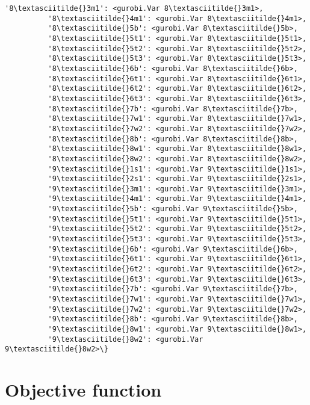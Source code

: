 \documentclass[11pt]{article}
\begin{document}
\begin{Verbatim}[commandchars=\\\{\}]
          '8\textasciitilde{}3m1': <gurobi.Var 8\textasciitilde{}3m1>,
          '8\textasciitilde{}4m1': <gurobi.Var 8\textasciitilde{}4m1>,
          '8\textasciitilde{}5b': <gurobi.Var 8\textasciitilde{}5b>,
          '8\textasciitilde{}5t1': <gurobi.Var 8\textasciitilde{}5t1>,
          '8\textasciitilde{}5t2': <gurobi.Var 8\textasciitilde{}5t2>,
          '8\textasciitilde{}5t3': <gurobi.Var 8\textasciitilde{}5t3>,
          '8\textasciitilde{}6b': <gurobi.Var 8\textasciitilde{}6b>,
          '8\textasciitilde{}6t1': <gurobi.Var 8\textasciitilde{}6t1>,
          '8\textasciitilde{}6t2': <gurobi.Var 8\textasciitilde{}6t2>,
          '8\textasciitilde{}6t3': <gurobi.Var 8\textasciitilde{}6t3>,
          '8\textasciitilde{}7b': <gurobi.Var 8\textasciitilde{}7b>,
          '8\textasciitilde{}7w1': <gurobi.Var 8\textasciitilde{}7w1>,
          '8\textasciitilde{}7w2': <gurobi.Var 8\textasciitilde{}7w2>,
          '8\textasciitilde{}8b': <gurobi.Var 8\textasciitilde{}8b>,
          '8\textasciitilde{}8w1': <gurobi.Var 8\textasciitilde{}8w1>,
          '8\textasciitilde{}8w2': <gurobi.Var 8\textasciitilde{}8w2>,
          '9\textasciitilde{}1s1': <gurobi.Var 9\textasciitilde{}1s1>,
          '9\textasciitilde{}2s1': <gurobi.Var 9\textasciitilde{}2s1>,
          '9\textasciitilde{}3m1': <gurobi.Var 9\textasciitilde{}3m1>,
          '9\textasciitilde{}4m1': <gurobi.Var 9\textasciitilde{}4m1>,
          '9\textasciitilde{}5b': <gurobi.Var 9\textasciitilde{}5b>,
          '9\textasciitilde{}5t1': <gurobi.Var 9\textasciitilde{}5t1>,
          '9\textasciitilde{}5t2': <gurobi.Var 9\textasciitilde{}5t2>,
          '9\textasciitilde{}5t3': <gurobi.Var 9\textasciitilde{}5t3>,
          '9\textasciitilde{}6b': <gurobi.Var 9\textasciitilde{}6b>,
          '9\textasciitilde{}6t1': <gurobi.Var 9\textasciitilde{}6t1>,
          '9\textasciitilde{}6t2': <gurobi.Var 9\textasciitilde{}6t2>,
          '9\textasciitilde{}6t3': <gurobi.Var 9\textasciitilde{}6t3>,
          '9\textasciitilde{}7b': <gurobi.Var 9\textasciitilde{}7b>,
          '9\textasciitilde{}7w1': <gurobi.Var 9\textasciitilde{}7w1>,
          '9\textasciitilde{}7w2': <gurobi.Var 9\textasciitilde{}7w2>,
          '9\textasciitilde{}8b': <gurobi.Var 9\textasciitilde{}8b>,
          '9\textasciitilde{}8w1': <gurobi.Var 9\textasciitilde{}8w1>,
          '9\textasciitilde{}8w2': <gurobi.Var 9\textasciitilde{}8w2>\}
\end{Verbatim}
        
    \section{Objective function}\label{objective-function}
\end{document}
